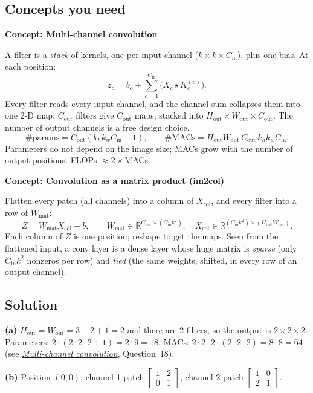\documentclass[12pt,a4paper]{article}
\newcommand{\concept}[2]{\par\medskip\phantomsection\label{#1}{\large\bfseries\color{blue!50!black} Concept: #2}\par}
\newcommand{\seeconcept}[3]{(see \hyperref[#1]{\textit{#2}}, Question~#3)}
\begin{document}
\subsection*{Concepts you need}

\concept{c:multichannel}{Multi-channel convolution}
A filter is a \emph{stack} of kernels, one per input channel ($k\times k\times C_{\text{in}}$), plus one bias. At each position:
\[
z_o=b_o+\sum_{c=1}^{C_{\text{in}}}\bigl(X_c\star K^{(o)}_c\bigr).
\]
Every filter reads every input channel, and the channel sum collapses them into one 2-D map. $C_{\text{out}}$ filters give $C_{\text{out}}$ maps, stacked into $H_{\text{out}}\times W_{\text{out}}\times C_{\text{out}}$. The number of output channels is a free design choice.
\[
\#\text{params}=C_{\text{out}}(k_hk_wC_{\text{in}}+1),\qquad \#\text{MACs}=H_{\text{out}}W_{\text{out}}\,C_{\text{out}}\,k_hk_wC_{\text{in}} .
\]
Parameters do not depend on the image size; MACs grow with the number of output positions. FLOPs $\approx2\times$MACs.

\concept{c:im2col}{Convolution as a matrix product (im2col)}
Flatten every patch (all channels) into a column of $X_{\text{col}}$, and every filter into a row of $W_{\text{mat}}$:
\[
Z=W_{\text{mat}}X_{\text{col}}+b,\qquad W_{\text{mat}}\in\mathbb R^{C_{\text{out}}\times(C_{\text{in}}k^2)},\quad X_{\text{col}}\in\mathbb R^{(C_{\text{in}}k^2)\times(H_{\text{out}}W_{\text{out}})} .
\]
Each column of $Z$ is one position; reshape to get the maps. Seen from the flattened input, a conv layer is a dense layer whose huge matrix is \emph{sparse} (only $C_{\text{in}}k^2$ nonzeros per row) and \emph{tied} (the same weights, shifted, in every row of an output channel).

\subsection*{Solution}
\textbf{(a)} $H_{\text{out}}=W_{\text{out}}=3-2+1=2$ and there are 2 filters, so the output is $2\times2\times2$. Parameters: $2\cdot(2\cdot2\cdot2+1)=2\cdot9=18$. MACs: $2\cdot2\cdot2\cdot(2\cdot2\cdot2)=8\cdot8=64$ \seeconcept{c:multichannel}{Multi-channel convolution}{18}.

\textbf{(b)} Position $(0,0)$: channel 1 patch $\begin{bmatrix}1&2\\0&1\end{bmatrix}$, channel 2 patch $\begin{bmatrix}1&0\\2&1\end{bmatrix}$.
\end{document}
